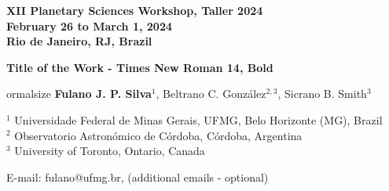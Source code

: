 \documentclass[11pt,english]{article}
\begin{document}
\begin{center}
\footnotesize
\textbf{XII Planetary Sciences Workshop, Taller 2024\\
February 26 to March 1, 2024\\
Rio de Janeiro, RJ, Brazil}\\
\vspace{0.8cm}

\Large
\textbf{Title of the Work - Times New Roman 14, Bold}
\vspace{0.8cm}


ormalsize
\textbf{Fulano J. P. Silva}$^{1}$, Beltrano C. González$^{2,3}$, Sicrano B. Smith$^{3}$
\vspace{0.4cm}

$^{1}$ Universidade Federal de Minas Gerais, UFMG, Belo Horizonte (MG), Brazil\\
$^{2}$ Observatorio Astronómico de Córdoba, Córdoba, Argentina\\
$^{3}$ University of Toronto, Ontario, Canada
\vspace{0.4cm}

E-mail: fulano@ufmg.br, (additional emails - optional)
\end{center}
\vspace{0.5cm}
\end{document}
